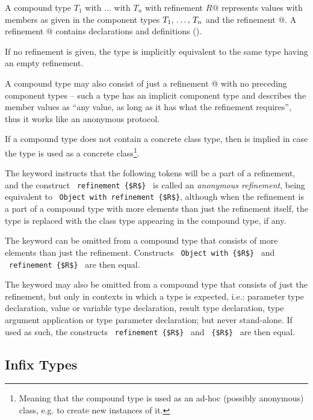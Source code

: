 A compound type \lstinline@$T_1$ with $\ldots$ with $T_n$ with refinement {$R$}@ represents values with members as given in the component types $T_1 ,\, \ldots ,\, T_n$ and the refinement @. A refinement @ contains declarations and definitions (). 

If no refinement is given, the type is implicitly equivalent to the same type having an empty refinement. 

A compound type may also consist of just a refinement @ with no preceding component types -- such a type has an implicit component type  and describes the member values as ``any value, as long as it has what the refinement requires'', thus it works like an anonymous protocol. 

If a compound type does not contain a concrete class type, then  is implied in case the type is used as a concrete class\footnote{Meaning that the compound type is used as an ad-hoc (possibly anonymous) class, e.g. to create new instances of it.}.

The keyword  instructs that the following tokens will be a part of a refinement, and the construct ~\lstinline!refinement {$R$}!~ is called an {\em anonymous refinement}, being equivalent to ~\lstinline!Object with refinement {$R$}!, although when the refinement is a part of a compound type with more elements than just the refinement itself, the  type is replaced with the class type appearing in the compound type, if any. 

The  keyword can be omitted from a compound type that consists of more elements than just the refinement. Constructs ~\lstinline!Object with {$R$}!~ and ~\lstinline!refinement {$R$}!~ are then equal. 

The  keyword may also be omitted from a compound type that consists of just the refinement, but only in contexts in which a type is expected, i.e.: parameter type declaration, value or variable type declaration, result type declaration, type argument application or type parameter declaration; but never stand-alone. If used as such, the constructs ~\lstinline!refinement {$R$}!~ and ~\lstinline!{$R$}!~ are then equal. 





\subsection{Infix Types}
\label{sec:infix-types}

